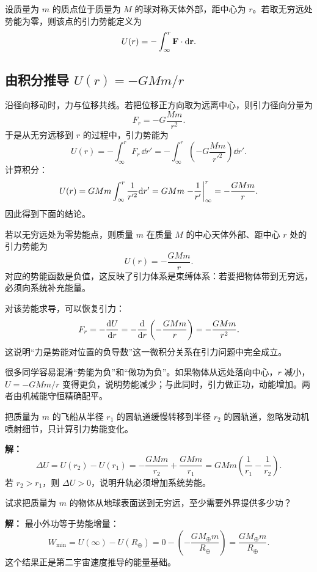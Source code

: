 \begin{definition}[引力势能]
设质量为 $m$ 的质点位于质量为 $M$ 的球对称天体外部，距中心为 $r$。若取无穷远处势能为零，则该点的引力势能定义为
\[
U(r)=-\int_{\infty}^{r}\vb{F}\cdot \dd \vb{r}.
\]
\end{definition}

\subsection{由积分推导 $U(r)=-GMm/r$}

沿径向移动时，力与位移共线。若把位移正方向取为远离中心，则引力径向分量为
\[
F_r=-G\frac{Mm}{r^2}.
\]
于是从无穷远移到 $r$ 的过程中，引力势能为
\[
U(r)=-\int_{\infty}^{r}F_r\,\dd r'=-\int_{\infty}^{r}\left(-G\frac{Mm}{r'^2}\right)\dd r'.
\]
计算积分：
\[
U(r)=G Mm\int_{\infty}^{r}\frac{1}{r'^2}\dd r' = G Mm\eval{-\frac{1}{r'}}_{\infty}^{r}=-\frac{GMm}{r}.
\]
因此得到下面的结论。

\begin{theorem}[球对称天体外部的引力势能]
若以无穷远处为零势能点，则质量 $m$ 在质量 $M$ 的中心天体外部、距中心 $r$ 处的引力势能为
\[
U(r)=-\frac{GMm}{r}.
\]
对应的势能函数是负值，这反映了引力体系是束缚体系：若要把物体带到无穷远，必须向系统补充能量。
\end{theorem}

对该势能求导，可以恢复引力：
\[
F_r=-\dv{U}{r}=-\dv{}{r}\left(-\frac{GMm}{r}\right)=-\frac{GMm}{r^2}.
\]
这说明“力是势能对位置的负导数”这一微积分关系在引力问题中完全成立。

\begin{remark}
很多同学容易混淆“势能为负”和“做功为负”。如果物体从远处落向中心，$r$ 减小，$U=-GMm/r$ 变得更负，说明势能减少；与此同时，引力做正功，动能增加。两者由机械能守恒精确配平。
\end{remark}

\begin{example}
把质量为 $m$ 的飞船从半径 $r_1$ 的圆轨道缓慢转移到半径 $r_2$ 的圆轨道，忽略发动机喷射细节，只计算引力势能变化。

\textbf{解：}
\[
\Delta U=U(r_2)-U(r_1)=-\frac{GMm}{r_2}+\frac{GMm}{r_1}=GMm\left(\frac{1}{r_1}-\frac{1}{r_2}\right).
\]
若 $r_2>r_1$，则 $\Delta U>0$，说明升轨必须增加系统势能。
\end{example}

\begin{example}
试求把质量为 $m$ 的物体从地球表面送到无穷远，至少需要外界提供多少功？

\textbf{解：} 最小外功等于势能增量：
\[
W_{\min}=U(\infty)-U(R_\oplus)=0-\left(-\frac{GM_\oplus m}{R_\oplus}\right)=\frac{GM_\oplus m}{R_\oplus}.
\]
这个结果正是第二宇宙速度推导的能量基础。
\end{example}

